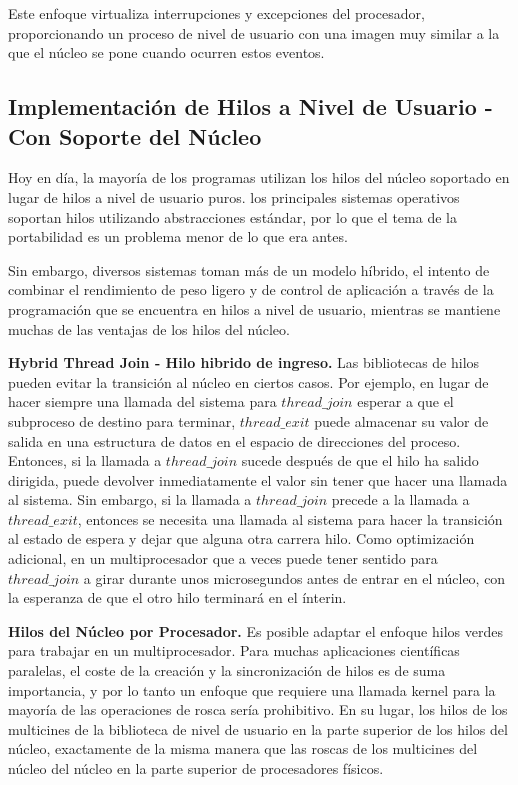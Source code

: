 \documentclass[10pt]{book}
\begin{document}
Este enfoque virtualiza interrupciones y excepciones del procesador, proporcionando un proceso de nivel de usuario con una imagen muy similar a la que el núcleo se pone cuando ocurren estos eventos.

\subsection{Implementación de Hilos a Nivel de Usuario - Con Soporte del Núcleo}
Hoy en día, la mayoría de los programas utilizan los hilos del núcleo soportado en lugar de hilos a nivel de usuario puros. los principales sistemas operativos soportan hilos utilizando abstracciones estándar, por lo que el tema de la portabilidad es un problema menor de lo que era antes.

Sin embargo, diversos sistemas toman más de un modelo híbrido, el intento de combinar el rendimiento de peso ligero y de control de aplicación a través de la programación que se encuentra en hilos a nivel de usuario, mientras se mantiene muchas de las ventajas de los hilos del núcleo.

\textbf{Hybrid Thread Join - Hilo hibrido de ingreso.} Las bibliotecas de hilos pueden evitar la transición al núcleo en ciertos casos. Por ejemplo, en lugar de hacer siempre una llamada del sistema para $thread\_join$ esperar a que el subproceso de destino para terminar, $thread\_exit$ puede almacenar su valor de salida en una estructura de datos en el espacio de direcciones del proceso. Entonces, si la llamada a $thread\_join$ sucede después de que el hilo ha salido dirigida, puede devolver inmediatamente el valor sin tener que hacer una llamada al sistema. Sin embargo, si la llamada a $thread\_join$ precede a la llamada a $thread\_exit$, entonces se necesita una llamada al sistema para hacer la transición al estado de espera y dejar que alguna otra carrera hilo. Como optimización adicional, en un multiprocesador que a veces puede tener sentido para $thread\_join$ a girar durante unos microsegundos antes de entrar en el núcleo, con la esperanza de que el otro hilo terminará en el ínterin.

\textbf{Hilos del Núcleo por Procesador.} Es posible adaptar el enfoque hilos verdes para trabajar en un multiprocesador. Para muchas aplicaciones científicas paralelas, el coste de la creación y la sincronización de hilos es de suma importancia, y por lo tanto un enfoque que requiere una llamada kernel para la mayoría de las operaciones de rosca sería prohibitivo. En su lugar, los hilos de los multicines de la biblioteca de nivel de usuario en la parte superior de los hilos del núcleo, exactamente de la misma manera que las roscas de los multicines del núcleo del núcleo en la parte superior de procesadores físicos.
\end{document}

